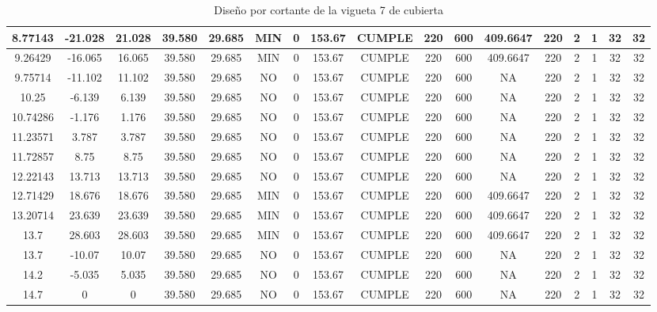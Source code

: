 \begin{table}[h]
{\begin{tabular}{|c|c|c|c|c|c|c|c|c|c|c|c|c|c|c|c|c|}
    \hline
    8.77143 & -21.028 & 21.028 & 39.580 & 29.685 & MIN & 0   & 153.67 & CUMPLE & 220 & 600 & 409.6647 & 220 & 2   & 1   & 32  & 32 \bigstrut\\
    \hline
    9.26429 & -16.065 & 16.065 & 39.580 & 29.685 & MIN & 0   & 153.67 & CUMPLE & 220 & 600 & 409.6647 & 220 & 2   & 1   & 32  & 32 \bigstrut\\
    \hline
    9.75714 & -11.102 & 11.102 & 39.580 & 29.685 & NO  & 0   & 153.67 & CUMPLE & 220 & 600 & NA  & 220 & 2   & 1   & 32  & 32 \bigstrut\\
    \hline
    10.25 & -6.139 & 6.139 & 39.580 & 29.685 & NO  & 0   & 153.67 & CUMPLE & 220 & 600 & NA  & 220 & 2   & 1   & 32  & 32 \bigstrut\\
    \hline
    10.74286 & -1.176 & 1.176 & 39.580 & 29.685 & NO  & 0   & 153.67 & CUMPLE & 220 & 600 & NA  & 220 & 2   & 1   & 32  & 32 \bigstrut\\
    \hline
    11.23571 & 3.787 & 3.787 & 39.580 & 29.685 & NO  & 0   & 153.67 & CUMPLE & 220 & 600 & NA  & 220 & 2   & 1   & 32  & 32 \bigstrut\\
    \hline
    11.72857 & 8.75 & 8.75 & 39.580 & 29.685 & NO  & 0   & 153.67 & CUMPLE & 220 & 600 & NA  & 220 & 2   & 1   & 32  & 32 \bigstrut\\
    \hline
    12.22143 & 13.713 & 13.713 & 39.580 & 29.685 & NO  & 0   & 153.67 & CUMPLE & 220 & 600 & NA  & 220 & 2   & 1   & 32  & 32 \bigstrut\\
    \hline
    12.71429 & 18.676 & 18.676 & 39.580 & 29.685 & MIN & 0   & 153.67 & CUMPLE & 220 & 600 & 409.6647 & 220 & 2   & 1   & 32  & 32 \bigstrut\\
    \hline
    13.20714 & 23.639 & 23.639 & 39.580 & 29.685 & MIN & 0   & 153.67 & CUMPLE & 220 & 600 & 409.6647 & 220 & 2   & 1   & 32  & 32 \bigstrut\\
    \hline
    13.7 & 28.603 & 28.603 & 39.580 & 29.685 & MIN & 0   & 153.67 & CUMPLE & 220 & 600 & 409.6647 & 220 & 2   & 1   & 32  & 32 \bigstrut\\
    \hline
    13.7 & -10.07 & 10.07 & 39.580 & 29.685 & NO  & 0   & 153.67 & CUMPLE & 220 & 600 & NA  & 220 & 2   & 1   & 32  & 32 \bigstrut\\
    \hline
    14.2 & -5.035 & 5.035 & 39.580 & 29.685 & NO  & 0   & 153.67 & CUMPLE & 220 & 600 & NA  & 220 & 2   & 1   & 32  & 32 \bigstrut\\
    \hline
    14.7 & 0   & 0   & 39.580 & 29.685 & NO  & 0   & 153.67 & CUMPLE & 220 & 600 & NA  & 220 & 2   & 1   & 32  & 32 \bigstrut\\
    \hline
    
    \end{tabular}}%
    \caption{Diseño por cortante de la vigueta 7 de cubierta}
  \label{tab:CORT VT7 CUB}%
\end{table}%
